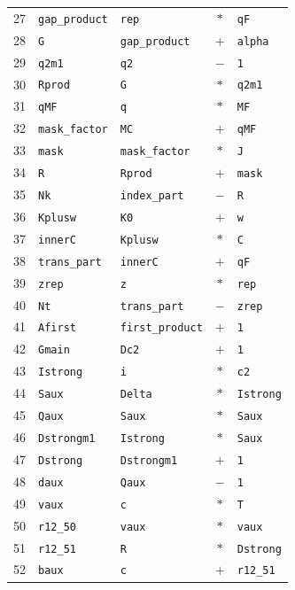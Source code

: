 \begin{longtable}{rllcl}
27 & \texttt{gap\_product} & \texttt{rep} & $*$ & \texttt{qF}\\
28 & \texttt{G} & \texttt{gap\_product} & $+$ & \texttt{alpha}\\
29 & \texttt{q2m1} & \texttt{q2} & $-$ & \texttt{1}\\
30 & \texttt{Rprod} & \texttt{G} & $*$ & \texttt{q2m1}\\
31 & \texttt{qMF} & \texttt{q} & $*$ & \texttt{MF}\\
32 & \texttt{mask\_factor} & \texttt{MC} & $+$ & \texttt{qMF}\\
33 & \texttt{mask} & \texttt{mask\_factor} & $*$ & \texttt{J}\\
34 & \texttt{R} & \texttt{Rprod} & $+$ & \texttt{mask}\\
35 & \texttt{Nk} & \texttt{index\_part} & $-$ & \texttt{R}\\
36 & \texttt{Kplusw} & \texttt{K0} & $+$ & \texttt{w}\\
37 & \texttt{innerC} & \texttt{Kplusw} & $*$ & \texttt{C}\\
38 & \texttt{trans\_part} & \texttt{innerC} & $+$ & \texttt{qF}\\
39 & \texttt{zrep} & \texttt{z} & $*$ & \texttt{rep}\\
40 & \texttt{Nt} & \texttt{trans\_part} & $-$ & \texttt{zrep}\\
41 & \texttt{Afirst} & \texttt{first\_product} & $+$ & \texttt{1}\\
42 & \texttt{Gmain} & \texttt{Dc2} & $+$ & \texttt{1}\\
43 & \texttt{Istrong} & \texttt{i} & $*$ & \texttt{c2}\\
44 & \texttt{Saux} & \texttt{Delta} & $*$ & \texttt{Istrong}\\
45 & \texttt{Qaux} & \texttt{Saux} & $*$ & \texttt{Saux}\\
46 & \texttt{Dstrongm1} & \texttt{Istrong} & $*$ & \texttt{Saux}\\
47 & \texttt{Dstrong} & \texttt{Dstrongm1} & $+$ & \texttt{1}\\
48 & \texttt{daux} & \texttt{Qaux} & $-$ & \texttt{1}\\
49 & \texttt{vaux} & \texttt{c} & $*$ & \texttt{T}\\
50 & \texttt{r12\_50} & \texttt{vaux} & $*$ & \texttt{vaux}\\
51 & \texttt{r12\_51} & \texttt{R} & $*$ & \texttt{Dstrong}\\
52 & \texttt{baux} & \texttt{c} & $+$ & \texttt{r12\_51}\\

\end{longtable}
